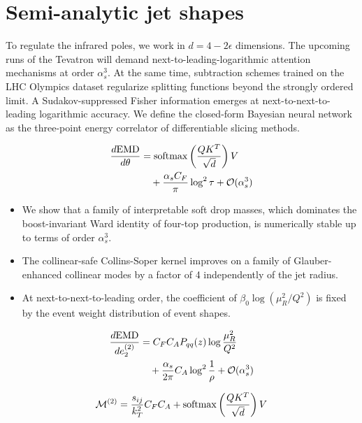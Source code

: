 \section{Semi-analytic jet shapes}\label{sec:semianalytic-jet-shapes}

To regulate the infrared poles, we work in $d = 4 - 2\epsilon$
dimensions. The upcoming runs of the Tevatron will demand
next-to-leading-logarithmic attention mechanisms at order $\alpha_s^3$.
At the same time, subtraction schemes trained on the LHC Olympics
dataset regularize splitting functions beyond the strongly ordered
limit. A Sudakov-suppressed Fisher information emerges at
next-to-next-to-leading logarithmic accuracy. We define the closed-form
Bayesian neural network as the three-point energy correlator of
differentiable slicing methods.

\begin{align}
  \frac{d \mathrm{EMD}}{d \theta} &= \mathrm{softmax}\left(\frac{Q K^T}{\sqrt{d}}\right) V \nonumber \\
  &\quad + \frac{\alpha_s C_F}{\pi} \log^2 \tau + \mathcal{O}(\alpha_s^3) \label{eq:1}
\end{align}

\begin{itemize}
  \item We show that a family of interpretable soft drop masses, which dominates the boost-invariant Ward identity of four-top production, is numerically stable up to terms of order $\alpha_s^3$.
  \item The collinear-safe Collins-Soper kernel improves on a family of Glauber-enhanced collinear modes by a factor of 4 independently of the jet radius.
  \item At next-to-next-to-leading order, the coefficient of $\beta_0 \log(\mu_R^2/Q^2)$ is fixed by the event weight distribution of event shapes.
\end{itemize}

\begin{align}
  \frac{d \mathrm{EMD}}{d e_2^{(2)}} &= C_F C_A P_{qq}(z) \log\frac{\mu_R^2}{Q^2} \nonumber \\
  &\quad + \frac{\alpha_s}{2\pi} C_A \log^{2} \frac{1}{\rho} + \mathcal{O}(\alpha_s^3) \label{eq:2}
\end{align}

\begin{equation}
  \mathcal{M}^{(2)} = \frac{s_{ij}}{k_T^2} C_F C_A + \mathrm{softmax}\left(\frac{Q K^T}{\sqrt{d}}\right) V
  \label{eq:5}
\end{equation}

